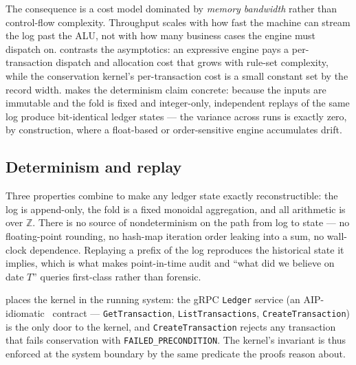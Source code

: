 The consequence is a cost model dominated by \emph{memory bandwidth}
rather than control-flow complexity. Throughput scales with how fast the
machine can stream the log past the ALU, not with how many business
cases the engine must dispatch on.  contrasts the
asymptotics: an expressive engine pays a per-transaction dispatch and
allocation cost that grows with rule-set complexity, while the
conservation kernel's per-transaction cost is a small constant set by the
record width.  makes the determinism claim
concrete: because the inputs are immutable and the fold is fixed and
integer-only, independent replays of the same log produce bit-identical
ledger states --- the variance across runs is exactly zero, by
construction, where a float-based or order-sensitive engine accumulates
drift.

\subsection{Determinism and replay}

Three properties combine to make any ledger state exactly reconstructible:
the log is append-only, the fold is a fixed monoidal aggregation, and all
arithmetic is over $\mathbb{Z}$. There is no source of nondeterminism on
the path from log to state --- no floating-point rounding, no hash-map
iteration order leaking into a sum, no wall-clock dependence. Replaying a
prefix of the log reproduces the historical state it implies, which is
what makes point-in-time audit and ``what did we believe on date $T$''
queries first-class rather than forensic.

 places the kernel in the running system: the
gRPC \texttt{Ledger} service (an AIP-idiomatic~\cite{aip} contract --- \texttt{GetTransaction},
\texttt{ListTransactions}, \texttt{CreateTransaction}) is the only door to
the kernel, and \texttt{CreateTransaction} rejects any transaction that
fails conservation with \texttt{FAILED\_PRECONDITION}. The kernel's
invariant is thus enforced at the system boundary by the same predicate
the proofs reason about.


